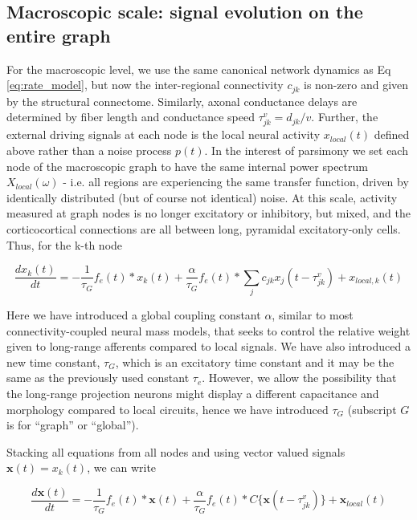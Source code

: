 \subsection{Macroscopic scale: signal evolution on the entire graph}
For the macroscopic level, we use the same canonical network dynamics as
Eq \ref{eq:rate_model}, but now the inter-regional connectivity $c_{jk}$ is
non-zero and given by the structural connectome. Similarly, axonal
conductance delays are determined by fiber length and conductance speed
$\tau_{jk}^{v} = d_{jk} / v$. Further, the external
driving signals at each node is the local neural activity
$x_{local}(t)$ defined above rather than a noise process
$p(t)$. In the interest of parsimony we set each node of the
macroscopic graph to have the same internal power spectrum
$X_{local}(\omega)$ - i.e. all regions are experiencing the
same transfer function, driven by identically distributed (but of course
not identical) noise. At this scale, activity measured at graph nodes is
no longer excitatory or inhibitory, but mixed, and the corticocortical
connections are all between long, pyramidal excitatory-only cells. Thus,
for the k-th node

\begin{equation}
\label{eq:node_eq}
\frac{dx_{k}(t)}{dt} = - \frac{1}{\tau_{G}}f_{e}(t) * x_{k}(t) + \frac{\alpha}{\tau_{G}} f_{e}(t) * \sum_{j} c_{jk} x_{j}(t - \tau_{jk}^{v}) + x_{local, k}(t)
\end{equation}

Here we have introduced a global coupling constant $\alpha$, similar
to most connectivity-coupled neural mass models, that seeks to control
the relative weight given to long-range afferents compared to local
signals. We have also introduced a new time constant, $\tau_{G}$,
which is an excitatory time constant and it may be the same as the
previously used constant $\tau_{e}$. However, we allow the possibility
that the long-range projection neurons might display a different
capacitance and morphology compared to local circuits, hence we have
introduced $\tau_{G}$ (subscript $G$ is for ``graph'' or ``global'').

Stacking all equations from all nodes and using vector valued signals
$\mathbf{x}(t) = { x_{k}(t)}$, we can write

\begin{equation}
\label{eq:vec_signal}
\frac{d\mathbf{x}(t)}{dt} = - \frac{1}{\tau_{G}} f_{e}(t) * \mathbf{x}(t) + \frac{\alpha}{\tau_{G}}f_{e}(t) * C\{ \mathbf{x} ( t - \tau_{jk}^{v} )\} + \mathbf{x}_{local}(t)
\end{equation}


